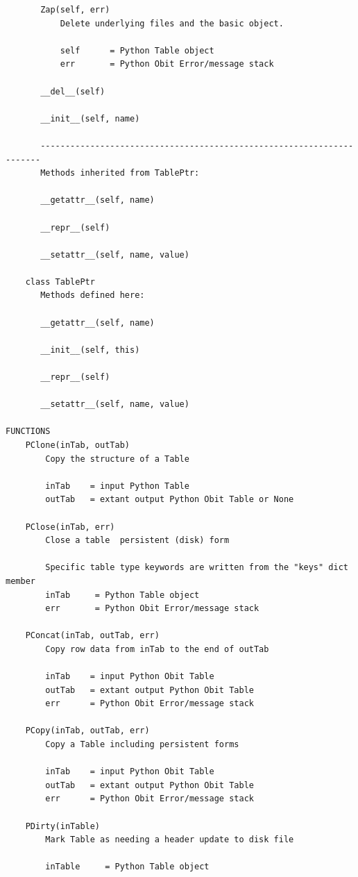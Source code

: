 \documentclass[11pt]{report}
\begin{document}
\begin{verbatim}
       Zap(self, err)
           Delete underlying files and the basic object.
           
           self      = Python Table object
           err       = Python Obit Error/message stack
       
       __del__(self)
       
       __init__(self, name)
       
       ----------------------------------------------------------------------
       Methods inherited from TablePtr:
       
       __getattr__(self, name)
       
       __repr__(self)
       
       __setattr__(self, name, value)
    
    class TablePtr
       Methods defined here:
       
       __getattr__(self, name)
       
       __init__(self, this)
       
       __repr__(self)
       
       __setattr__(self, name, value)

FUNCTIONS
    PClone(inTab, outTab)
        Copy the structure of a Table
        
        inTab    = input Python Table
        outTab   = extant output Python Obit Table or None
    
    PClose(inTab, err)
        Close a table  persistent (disk) form
        
        Specific table type keywords are written from the "keys" dict member
        inTab     = Python Table object
        err       = Python Obit Error/message stack
    
    PConcat(inTab, outTab, err)
        Copy row data from inTab to the end of outTab
        
        inTab    = input Python Obit Table
        outTab   = extant output Python Obit Table
        err      = Python Obit Error/message stack
    
    PCopy(inTab, outTab, err)
        Copy a Table including persistent forms
        
        inTab    = input Python Obit Table
        outTab   = extant output Python Obit Table
        err      = Python Obit Error/message stack
    
    PDirty(inTable)
        Mark Table as needing a header update to disk file
        
        inTable     = Python Table object
    

\end{verbatim}
\end{document}
